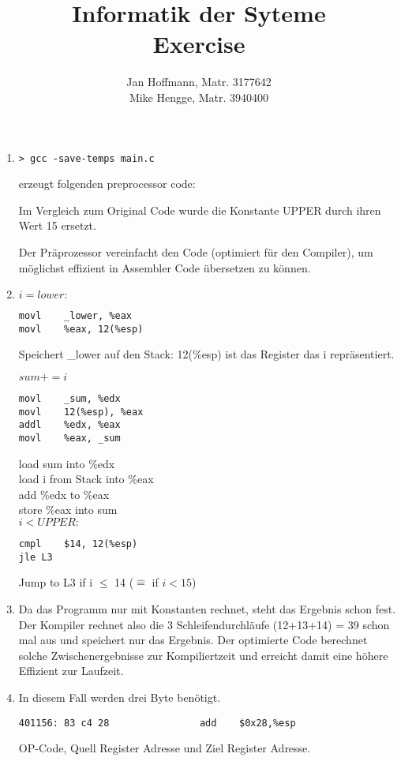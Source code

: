 \documentclass[10pt,a4paper]{article}
\title{Informatik der Syteme \\ Exercise \exnum}
\author{Jan Hoffmann, Matr. 3177642 \\ Mike Hengge,  Matr. 3940400}
\begin{document}
\section{}
	\begin{enumerate}
		\item 		
			\begin{lstlisting}[style=DOS] 
> gcc -save-temps main.c
			\end{lstlisting}
			erzeugt folgenden preprocessor code:
			
		
			Im Vergleich zum Original Code wurde die Konstante UPPER durch ihren Wert 15 ersetzt.
		
			Der Präprozessor vereinfacht den Code (optimiert für den Compiler), um möglichst effizient in Assembler Code übersetzen zu können.
			
		\item 
			$i = lower:$ \\
			\begin{lstlisting}[style=Assembler]
movl	_lower, %eax
movl	%eax, 12(%esp)
			\end{lstlisting}
			Speichert \_lower auf den Stack: 12(\%esp) ist das Register das i repräsentiert.
			
			$sum += i$ \\
			\begin{lstlisting}[style=Assembler]
movl	_sum, %edx
movl	12(%esp), %eax
addl	%edx, %eax
movl	%eax, _sum
			\end{lstlisting}
			load sum into \%edx\\
			load i from Stack into \%eax\\
			add \%edx to \%eax \\
			store \%eax into sum \\
			
			$i < UPPER:$\\
			\begin{lstlisting}[style=Assembler]
cmpl	$14, 12(%esp)
jle	L3			
			\end{lstlisting}
			Jump to L3 if i $\leq$ 14 ($\widehat{=}$ if $i < 15$)
		
		\item
			Da das Programm nur mit Konstanten rechnet, steht das Ergebnis schon fest. 
			Der Kompiler rechnet also die 3 Schleifendurchläufe (12+13+14) = 39 schon mal aus und speichert nur das Ergebnis.
			Der optimierte Code berechnet solche Zwischenergebnisse zur Kompiliertzeit und erreicht damit eine höhere Effizient zur Laufzeit.
		
		\item 
			In diesem Fall werden drei Byte benötigt.
			\begin{lstlisting}[style=Assembler]
401156:	83 c4 28             	add    $0x28,%esp
			\end{lstlisting}
			OP-Code, Quell Register Adresse und Ziel Register Adresse.
	\end{enumerate}
\section{}
	
\end{document}
